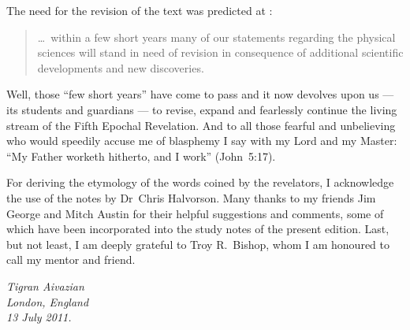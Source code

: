 The need for the revision of the text was predicted at :

\begin{quote}
\ldots\ within a few short years many of our statements regarding the physical sciences will stand in need of revision in consequence of additional scientific developments and new discoveries.
\end{quote}

Well, those ``few short years'' have come to pass and it now devolves upon us --- its students and guardians --- to revise,
expand and fearlessly continue the living stream of the Fifth Epochal Revelation.
And to all those fearful and unbelieving who would speedily accuse me of blasphemy I say with my Lord and my Master:
``My Father worketh hitherto, and I work'' (John~5:17).

For deriving the etymology of the words coined by the revelators, I acknowledge the use of the notes by Dr~Chris Halvorson.
Many thanks to my friends Jim George and Mitch Austin for their helpful suggestions and comments,
some of which have been incorporated into the study notes of the present edition.
Last, but not least, I am deeply grateful to Troy R.~Bishop, whom I am honoured to call my mentor and friend.


\begin{flushleft}
\itshape
\hspace*{6pt}Tigran Aivazian\\
\hspace*{6pt}London, England\\
\hspace*{6pt}13 July 2011.\\
\end{flushleft}
